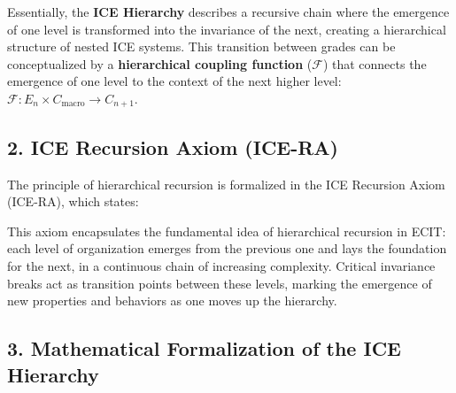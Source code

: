 \documentclass{article}
\begin{document}
Essentially, the \textbf{ICE Hierarchy} describes a recursive chain where the emergence of one level is transformed into the invariance of the next, creating a hierarchical structure of nested ICE systems. This transition between grades can be conceptualized by a \textbf{hierarchical coupling function} ($\mathcal{F}$) that connects the emergence of one level to the context of the next higher level: $\mathcal{F}: E_n \times C_{\text{macro}} \rightarrow C_{n+1}$.

\subsection{2. ICE Recursion Axiom (ICE-RA)}

The principle of hierarchical recursion is formalized in the ICE Recursion Axiom (ICE-RA), which states:
\bigskip

\noindent {}

\bigskip

This axiom encapsulates the fundamental idea of hierarchical recursion in ECIT: each level of organization emerges from the previous one and lays the foundation for the next, in a continuous chain of increasing complexity. Critical invariance breaks act as transition points between these levels, marking the emergence of new properties and behaviors as one moves up the hierarchy.

\subsection{3. Mathematical Formalization of the ICE Hierarchy}\label{subsec:formalizacion}
\end{document}
